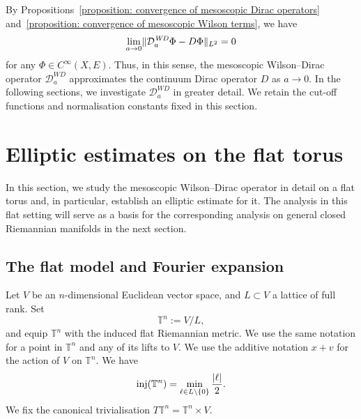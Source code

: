 \documentclass[a4paper,oneside,12pt]{amsart}
\theoremstyle{plain}
\theoremstyle{definition}
\theoremstyle{remark}
\DeclarePairedDelimiter{\abs}{\lvert}{\rvert}
\DeclarePairedDelimiter{\norm}{\lVert}{\rVert}
\DeclareMathOperator{\injectivityradius}{inj}
\newcommand{\flattorus}{\mathbb{T}^n}
\newcommand{\Lattice}{L}
\newcommand{\Ltwonorm}[2][L^2]{\norm{#2}_{#1}}
\newcommand{\mesoscopicWilsonDiracoperator}[1][a]{\mathcal{D}_{#1}^{\mathit{WD}}}
\begin{document}
By Propositions~\ref{proposition: convergence of mesoscopic Dirac operators} and~\ref{proposition: convergence of mesoscopic Wilson terms}, we have
\begin{equation}
  \lim_{a \to 0} \Ltwonorm{\mesoscopicWilsonDiracoperator \Phi - D \Phi} = 0
\end{equation}
for any $\Phi \in C^{\infty}(X,E)$.
Thus, in this sense, the mesoscopic Wilson--Dirac operator $\mesoscopicWilsonDiracoperator$ approximates the continuum Dirac operator $D$ as $a \to 0$.
In the following sections, we investigate $\mesoscopicWilsonDiracoperator$ in greater detail.
We retain the cut-off functions and normalisation constants fixed in this section.

\section{Elliptic estimates on the flat torus}\label{section: Elliptic estimates on the flat torus}

In this section, we study the mesoscopic Wilson--Dirac operator in detail on a flat torus and, in particular, establish an elliptic estimate for it.
The analysis in this flat setting will serve as a basis for the corresponding analysis on general closed Riemannian manifolds in the next section.

\subsection{The flat model and Fourier expansion}

Let $V$ be an $n$-dimensional Euclidean vector space, and $\Lattice \subset V$ a lattice of full rank.
Set
\begin{equation}
  \flattorus := V / \Lattice,
\end{equation}
and equip $\flattorus$ with the induced flat Riemannian metric.
We use the same notation for a point in $\flattorus$ and any of its lifts to $V$.
We use the additive notation $x+v$ for the action of $V$ on $\flattorus$.
We have
\begin{equation}
  \injectivityradius(\flattorus) = \min_{\ell \in \Lattice \setminus \{0\}} \frac{\abs{\ell}}{2}.
\end{equation}
We fix the canonical trivialisation $T\flattorus = \flattorus \times V$.
\end{document}
